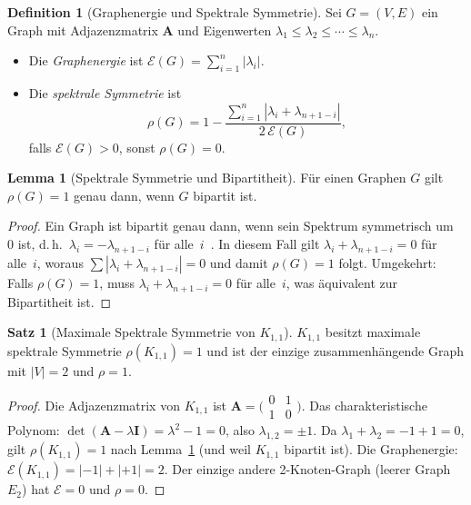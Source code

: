 ﻿\documentclass[a4paper,12pt]{article}
\theoremstyle{definition}
\newtheorem{definition}{Definition}
\newtheorem{satz}{Satz}
\newtheorem{lemma}{Lemma}
\begin{document}
\begin{definition}[Graphenergie und Spektrale Symmetrie]
	\label{def:spektral}
	Sei $G = (V, E)$ ein Graph mit Adjazenzmatrix $\mathbf{A}$ und Eigenwerten
	$\lambda_1 \leq \lambda_2 \leq \cdots \leq \lambda_n$.
	\begin{itemize}
		\item Die \emph{Graphenergie} ist $\mathcal{E}(G) = \sum_{i=1}^n |\lambda_i|$.
		\item Die \emph{spektrale Symmetrie} ist
		\[
			\rho(G) = 1 - \frac{\sum_{i=1}^n |\lambda_i + \lambda_{n+1-i}|}{2\,\mathcal{E}(G)},
		\]
		falls $\mathcal{E}(G) > 0$, sonst $\rho(G) = 0$.
	\end{itemize}
\end{definition}

\begin{lemma}[Spektrale Symmetrie und Bipartitheit]
	\label{lem:bipspek}
	Für einen Graphen $G$ gilt $\rho(G) = 1$ genau dann, wenn $G$ bipartit ist.
\end{lemma}

\begin{proof}
	Ein Graph ist bipartit genau dann, wenn sein Spektrum symmetrisch um~$0$ ist,
	d.\,h.\ $\lambda_i = -\lambda_{n+1-i}$ für alle~$i$~\cite{bondy2008}.
	In diesem Fall gilt $\lambda_i + \lambda_{n+1-i} = 0$ für alle~$i$, woraus
	$\sum|\lambda_i + \lambda_{n+1-i}| = 0$ und damit $\rho(G) = 1$ folgt.
	Umgekehrt: Falls $\rho(G) = 1$, muss $\lambda_i + \lambda_{n+1-i} = 0$ für alle~$i$,
	was äquivalent zur Bipartitheit ist. \qedhere
\end{proof}

\begin{satz}[Maximale Spektrale Symmetrie von $K_{1,1}$]
	\label{satz:spektral}
	$K_{1,1}$ besitzt maximale spektrale Symmetrie $\rho(K_{1,1}) = 1$ und
	ist der einzige zusammenhängende Graph mit $|V| = 2$ und $\rho = 1$.
\end{satz}

\begin{proof}
	Die Adjazenzmatrix von $K_{1,1}$ ist
	$\mathbf{A} = \bigl(\begin{smallmatrix}0&1\\1&0\end{smallmatrix}\bigr)$.
	Das charakteristische Polynom: $\det(\mathbf{A} - \lambda\mathbf{I})
	= \lambda^2 - 1 = 0$, also $\lambda_{1,2} = \pm 1$.
	Da $\lambda_1 + \lambda_2 = -1 + 1 = 0$, gilt $\rho(K_{1,1}) = 1$ nach
	Lemma~\ref{lem:bipspek} (und weil $K_{1,1}$ bipartit ist).
	Die Graphenergie: $\mathcal{E}(K_{1,1}) = |-1| + |+1| = 2$.
	Der einzige andere 2-Knoten-Graph (leerer Graph $E_2$) hat $\mathcal{E} = 0$
	und $\rho = 0$. \qedhere
\end{proof}
\end{document}
